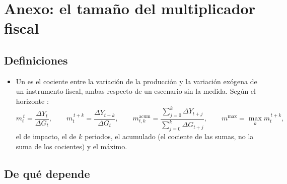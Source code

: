 \documentclass[11pt]{article}
\begin{document}
\section{Anexo: el tamaño del multiplicador fiscal}\label{anexo:multiplicadores}

\subsection{Definiciones}

\begin{itemize}
\item Un  es el cociente entre la variación de la producción y la variación exógena de un instrumento fiscal, ambas respecto de un escenario sin la medida. Según el horizonte :
  \begin{equation*}
  m^{\,t}_t=\frac{\Delta Y_t}{\Delta G_t},\qquad m^{\,t+k}_t=\frac{\Delta Y_{t+k}}{\Delta G_t},\qquad m^{\mathrm{acum}}_{t,k}=\frac{\sum_{j=0}^{k}\Delta Y_{t+j}}{\sum_{j=0}^{k}\Delta G_{t+j}},\qquad m^{\max}=\max_k m^{\,t+k}_t,
  \end{equation*}
  el de impacto, el de $k$ periodos, el acumulado (el cociente de las sumas, no la suma de los cocientes) y el máximo.
\end{itemize}

\subsection{De qué depende}
\end{document}
